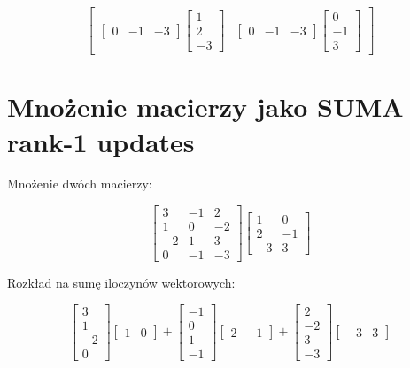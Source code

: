 \documentclass{article}
\begin{document}
\[\begin{bmatrix}
\begin{bmatrix} 0 & -1 & -3 \end{bmatrix} \begin{bmatrix} 1 \\ 2 \\ -3 \end{bmatrix} & 
\begin{bmatrix} 0 & -1 & -3 \end{bmatrix} \begin{bmatrix} 0 \\ -1 \\ 3 \end{bmatrix}
\end{bmatrix}
\]
\section{Mnożenie macierzy jako SUMA rank-1 updates}

Mnożenie dwóch macierzy:

\[
\begin{bmatrix} 
3 & -1 & 2 \\ 
1 & 0 & -2 \\ 
-2 & 1 & 3 \\ 
0 & -1 & -3 
\end{bmatrix} 
\begin{bmatrix} 
1 & 0 \\ 
2 & -1 \\ 
-3 & 3 
\end{bmatrix}
\]

Rozkład na sumę iloczynów wektorowych:

\[
\begin{bmatrix} 
3 \\ 1 \\ -2 \\ 0 
\end{bmatrix} 
\begin{bmatrix} 1 & 0 \end{bmatrix}
+
\begin{bmatrix} 
-1 \\ 0 \\ 1 \\ -1 
\end{bmatrix} 
\begin{bmatrix} 2 & -1 \end{bmatrix}
+
\begin{bmatrix} 
2 \\ -2 \\ 3 \\ -3 
\end{bmatrix} 
\begin{bmatrix} -3 & 3 \end{bmatrix}
\]
\end{document}
